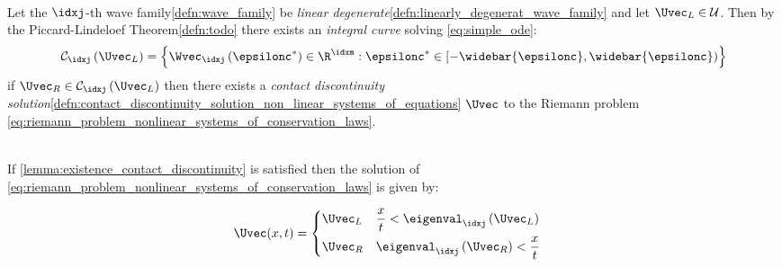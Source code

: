 \begin{lemmabox}\nospacing
    \begin{lemma}\label{lemma:existence_contact_discontinuity}\leavevmode\\
        Let the $\idxj$-th wave family\cref{defn:wave_family} be \textit{linear degenerate}\cref{defn:linearly_degenerat_wave_family}
        and let $\Uvec_{L}\in\admissibleset$.
        Then by the Piccard-Lindeloef Theorem\cref{defn:todo} there exists an \textit{integral curve} solving \cref{eq:simple_ode}:
        \begin{align}
          \mathcal{C}_{\idxj}\left(\Uvec_{L}\right)=\left\{\Wvec_{\idxj}\left(\epsilonc^{*}\right)\in\R^{\idxm}: \epsilonc^{*}\in[-\widebar{\epsilonc},\widebar{\epsilonc})\right\}
        \end{align}
        if $\Uvec_{R}\in\mathcal{C}_{\idxj}\left(\Uvec_{L}\right)$ then there exists a \textit{contact discontinuity solution}\cref{defn:contact_discontinuity_solution_non_linear_systems_of_equations} $\Uvec$ to the Riemann problem \cref{eq:riemann_problem_nonlinear_systems_of_conservation_laws}.
    \end{lemma}
\end{lemmabox}
\begin{defnbox}\nospacing
    \begin{defn}
        \label{defn:contact_discontinuity_solution_non_linear_systems_of_equations}\leavevmode\\
        If \cref{lemma:existence_contact_discontinuity} is satisfied then the solution of \cref{eq:riemann_problem_nonlinear_systems_of_conservation_laws} is given by:\\
        \begin{minipage}{0.55\textwidth}
        \begin{align}
          &\Uvec(x,t)=
          \left\{\begin{aligned}
              &\Uvec_{L}&&\frac{x}{t}<\eigenval_{\idxj}\left(\Uvec_{L}\right) \\
              &\Uvec_{R}&&\eigenval_{\idxj}\left(\Uvec_{R}\right)<\frac{x}{t}
          \end{aligned}\right.\label{eq:contact_discontinuity_solution_non_linear_systems_of_equations}
        \end{align}\hfill
        \end{minipage}
        \begin{minipage}{0.44\textwidth}
        \begin{figure}[H]
            \centering{
              \def\svgwidth{100pt}
              \resizebox{\linewidth}{!}{
                }
            }
        \end{figure}
        \end{minipage}
    \end{defn}
\end{defnbox}
